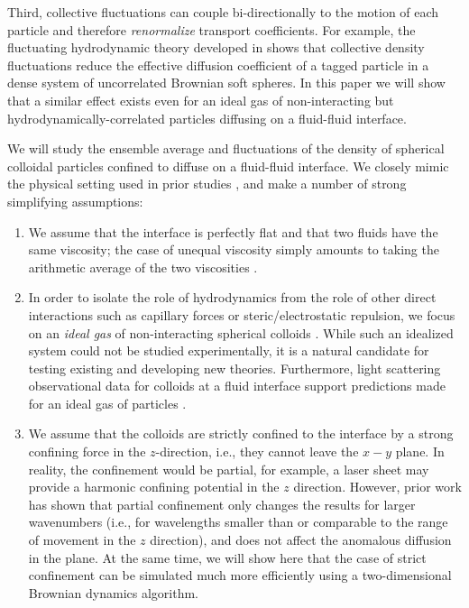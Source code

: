 \documentclass[ twoside,openright,titlepage,numbers=noenddot,%
headinclude,footinclude,cleardoublepage=empty,abstract=on,
BCOR=5mm,paper=a4,fontsize=11pt, dvipsnames
]{scrreprt}
\begin{document}
\begin{itemize}
Third, collective fluctuations can couple bi-directionally to the motion of each particle and therefore \emph{renormalize} transport coefficients. For example, the fluctuating hydrodynamic theory developed in \cite{TracerDiffusion_Demery} shows that collective density fluctuations reduce the effective diffusion coefficient of a tagged particle in a dense system of uncorrelated Brownian soft spheres.
In this paper we will show that a similar effect exists even for an ideal gas of non-interacting but hydrodynamically-correlated particles diffusing on a fluid-fluid interface.

We will study the ensemble average and fluctuations of the density of spherical colloidal particles confined to diffuse on a fluid-fluid interface. We closely mimic the physical setting used in prior studies \cite{ConfinedDiffusion_2D,DDFT_Diffusion_2D,Diffusion2D_IdealGas}, and make a number of strong simplifying assumptions:
\begin{enumerate}
\item We assume that the interface is perfectly flat and that two fluids have the same viscosity; the case of unequal viscosity simply amounts to taking the arithmetic average of the two viscosities \cite{Diffusion2D_TwoViscosities,FluidFluidInterface_Polymers}.
\item In order to isolate the role of hydrodynamics from the role of other direct interactions such as capillary forces or steric/electrostatic repulsion, we focus on an \emph{ideal gas} of non-interacting spherical colloids \cite{Diffusion2D_IdealGas}.
  While such an idealized system could not be studied experimentally, it is a natural candidate for testing existing and developing new theories.
  Furthermore, light scattering observational data for colloids at a fluid interface support predictions made for an ideal gas of particles \cite{Diffusion2D_IdealGas}.
\item We assume that the colloids are strictly confined to the interface by a strong confining force in the $z$-direction, i.e., they cannot leave the $x-y$ plane.
  In reality, the confinement would be partial, for example, a laser sheet may provide a harmonic confining potential in the $z$ direction. However, prior work \cite{PartiallyConfined_Quasi2D,PartiallyConfinedDiffusion_2D} has shown that partial confinement only changes the results for larger wavenumbers (i.e., for wavelengths smaller than or comparable to the range of movement in the $z$ direction), and does not affect the anomalous diffusion in the plane.
  At the same time, we will show here that the case of strict confinement can be simulated much more efficiently using a two-dimensional Brownian dynamics algorithm.

\end{enumerate}
\end{itemize}
\end{document}
